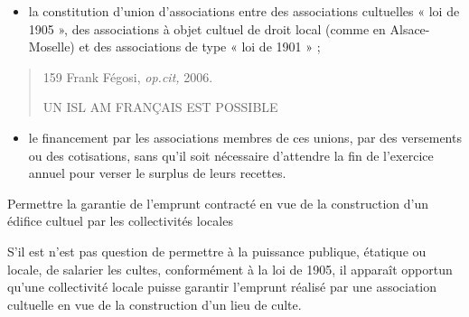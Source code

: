 \begin{itemize}
\item
  la constitution d'union d'associations entre des associations
  cultuelles « loi de 1905 », des associations à objet cultuel de droit
  local (comme en Alsace-Moselle) et des associations de type « loi de
  1901 » ;
\end{itemize}

\begin{quote}
159 Frank Fégosi, \emph{op.cit,} 2006.

UN ISL AM FRANÇAIS EST POSSIBLE
\end{quote}

\begin{itemize}
\item
  le financement par les associations membres de ces unions, par des
  versements ou des cotisations, sans qu'il soit nécessaire d'attendre
  la fin de l'exercice annuel pour verser le surplus de leurs recettes.
\end{itemize}

Permettre la garantie de l'emprunt contracté en vue de la construction
d'un édifice cultuel par les collectivités locales

S'il est n'est pas question de permettre à la puissance publique,
étatique ou locale, de salarier les cultes, conformément à la loi de
1905, il apparaît opportun qu'une collectivité locale puisse garantir
l'emprunt réalisé par une association cultuelle en vue de la
construction d'un lieu de culte.

